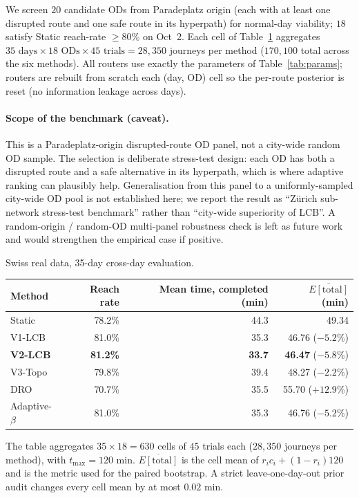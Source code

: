 \documentclass[opre,dblanonrev]{informs4}
\begin{document}
We screen $20$ candidate ODs from Paradeplatz origin (each with at
least one disrupted route and one safe route in its hyperpath) for
normal-day viability; $18$ satisfy Static reach-rate $\geq 80\%$ on
Oct~2. Each cell of Table~\ref{tab:swiss_multi} aggregates
$35\text{ days}\times18\text{ ODs}\times45\text{ trials} = 28{,}350$
journeys per method ($170{,}100$ total across the six methods). All
routers use exactly the parameters of Table~\ref{tab:params}; routers
are rebuilt from scratch each (day, OD) cell so the per-route
posterior is reset (no information leakage across days).

\paragraph{Scope of the benchmark (caveat).} This is a Paradeplatz-origin
disrupted-route OD panel, not a city-wide random OD sample. The
selection is deliberate stress-test design: each OD has both a
disrupted route and a safe alternative in its hyperpath, which is
where adaptive ranking can plausibly help. Generalisation from this
panel to a uniformly-sampled city-wide OD pool is not established
here; we report the result as ``Z\"urich sub-network stress-test
benchmark'' rather than ``city-wide superiority of LCB''. A
random-origin / random-OD multi-panel robustness check is left as
future work and would strengthen the empirical case if positive.

\begin{table}
\TABLE
{Swiss real data, 35-day cross-day evaluation.\label{tab:swiss_multi}}
{\begin{tabular}{l rrr}
\toprule
Method        & Reach rate & Mean time, completed (min) & $\overline{E[\mathrm{total}]}$ (min) \\
\midrule
Static            & 78.2\% & 44.3 & 49.34 \\
V1-LCB            & 81.0\% & 35.3 & 46.76 ($-5.2\%$) \\
\textbf{V2-LCB}   & \textbf{81.2\%} & \textbf{33.7} & \textbf{46.47} ($\bm{-5.8\%}$) \\
V3-Topo           & 79.8\% & 39.4 & 48.27 ($-2.2\%$) \\
DRO               & 70.7\% & 35.5 & 55.70 ($+12.9\%$) \\
Adaptive-$\beta$  & 81.0\% & 35.3 & 46.76 ($-5.2\%$) \\
\bottomrule
\end{tabular}}
{The table aggregates $35{\times}18{=}630$ cells of $45$
trials each ($28{,}350$ journeys per method), with
$t_{\max}{=}120$ min. $\overline{E[\mathrm{total}]}$ is the cell mean
of $r_i c_i+(1-r_i)120$ and is the metric used for the paired
bootstrap. A strict leave-one-day-out prior audit changes every cell
mean by at most $0.02$ min.}
\end{table}
\end{document}
